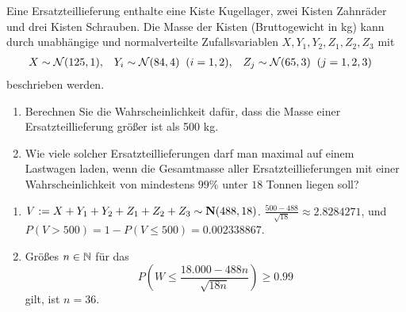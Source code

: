 %

 Eine Ersatzteillieferung enthalte eine Kiste
Kugellager, zwei Kisten Zahnräder und drei Kisten Schrauben.  Die Masse der
Kisten (Bruttogewicht in kg) kann durch unabhängige und normalverteilte
Zufallsvariablen $X, Y_1, Y_2, Z_1, Z_2, Z_3$ mit
\begin{align*}
    X&\sim \mathcal N(125, 1), & Y_i&\sim \mathcal N(84, 4)\;\;(i=1,2), & Z_j&\sim \mathcal N(65, 3)\;\; (j=1,2,3)
\end{align*}
beschrieben werden.
\begin{enumerate}
    \item Berechnen Sie die Wahrscheinlichkeit dafür, dass die Masse einer
        Ersatzteillieferung größer ist als 500 kg.

    \item Wie viele solcher Ersatzteillieferungen darf man maximal auf einem
        Lastwagen laden, wenn die Gesamtmasse aller Ersatzteillieferungen mit
        einer Wahrscheinlichkeit von mindestens $99\%$ unter $18$ Tonnen liegen
        soll?
\end{enumerate}

\solution
\begin{enumerate}
    \item $V := X + Y_1 + Y_2 + Z_1+Z_2+Z_3 \sim  \mathbf N(488, 18)$. $\frac{500 -
        488}{\sqrt{18}} \approx 2.8284271$, und $P(V>500)= 1 - P(V\leq 500) =
        0.002338867$.
    \item Größes $n\in \mathbb N$ für das
        \begin{equation*}
            P\left( W \leq \frac{18.000 - 488 n }{\sqrt{18 n}} \right) \geq 0.99
        \end{equation*}
        gilt, ist $n=36$. 
\end{enumerate}

